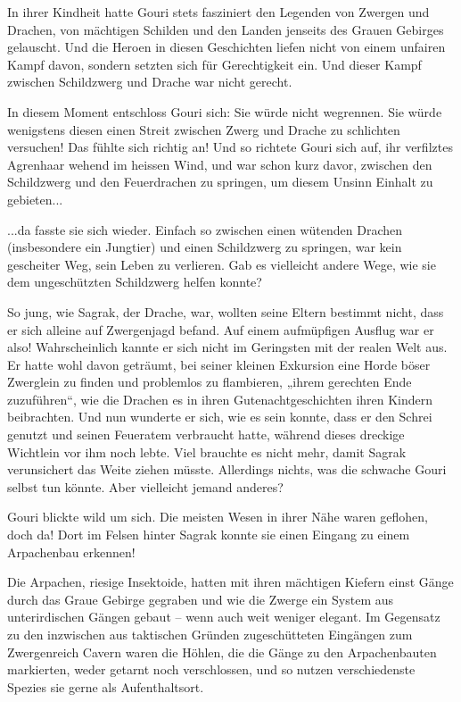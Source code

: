\documentclass[10pt, a4paper, oneside]{book}
\begin{document}
In ihrer Kindheit hatte Gouri stets fasziniert den Legenden von Zwergen und Drachen, von mächtigen Schilden und den Landen jenseits des Grauen Gebirges gelauscht. Und die Heroen in diesen Geschichten liefen nicht von einem unfairen Kampf davon, sondern setzten sich für Gerechtigkeit ein. Und dieser Kampf zwischen Schildzwerg und Drache war nicht gerecht.

In diesem Moment entschloss Gouri sich: Sie würde nicht wegrennen. Sie würde wenigstens diesen einen Streit zwischen Zwerg und Drache zu schlichten versuchen! Das fühlte sich richtig an! Und so richtete Gouri sich auf, ihr verfilztes Agrenhaar wehend im heissen Wind, und war schon kurz davor, zwischen den Schildzwerg und den Feuerdrachen zu springen, um diesem Unsinn Einhalt zu gebieten...

...da fasste sie sich wieder. Einfach so zwischen einen wütenden Drachen (insbesondere ein Jungtier) und einen Schildzwerg zu springen, war kein gescheiter Weg, sein Leben zu verlieren. Gab es vielleicht andere Wege, wie sie dem ungeschützten Schildzwerg helfen konnte?

So jung, wie Sagrak, der Drache, war, wollten seine Eltern bestimmt nicht, dass er sich alleine auf Zwergenjagd befand. Auf einem aufmüpfigen Ausflug war er also! Wahrscheinlich kannte er sich nicht im Geringsten mit der realen Welt aus. Er hatte wohl davon geträumt, bei seiner kleinen Exkursion eine Horde böser Zwerglein zu finden und problemlos zu flambieren, „ihrem gerechten Ende zuzuführen“, wie die Drachen es in ihren Gutenachtgeschichten ihren Kindern beibrachten. Und nun wunderte er sich, wie es sein konnte, dass er den Schrei genutzt und seinen Feueratem verbraucht hatte, während dieses dreckige Wichtlein vor ihm noch lebte. Viel brauchte es nicht mehr, damit Sagrak verunsichert das Weite ziehen müsste. Allerdings nichts, was die schwache Gouri selbst tun könnte. Aber vielleicht jemand anderes?

Gouri blickte wild um sich. Die meisten Wesen in ihrer Nähe waren geflohen, doch da! Dort im Felsen hinter Sagrak konnte sie einen Eingang zu einem Arpachenbau erkennen!

Die Arpachen, riesige Insektoide, hatten mit ihren mächtigen Kiefern einst Gänge durch das Graue Gebirge gegraben und wie die Zwerge ein System aus unterirdischen Gängen gebaut – wenn auch weit weniger elegant. Im Gegensatz zu den inzwischen aus taktischen Gründen zugeschütteten Eingängen zum Zwergenreich Cavern waren die Höhlen, die die Gänge zu den Arpachenbauten markierten, weder getarnt noch verschlossen, und so nutzen verschiedenste Spezies sie gerne als Aufenthaltsort.
\end{document}
